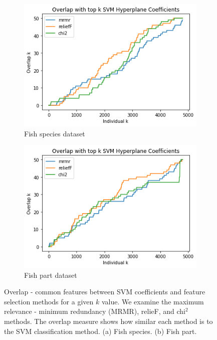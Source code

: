 \documentclass{article}
\begin{document}
\begin{figure}[htb]
  \centering
  \begin{subfigure}[b]{\linewidth}
    \includegraphics[width=1\linewidth]{fish_overlap_with_coefficients.png}
    \caption{Fish species dataset}
    \label{fig:fish-hyperplane-overlap}
  \end{subfigure}

  \begin{subfigure}[b]{\linewidth}
    \includegraphics[width=1\linewidth]{part_overlap_with_coefficients.png}
    \caption{Fish part dataset}
    \label{fig:part-hyperplane-overlap}
  \end{subfigure}
  \caption[Two numerical solutions]{
    Overlap - common features between SVM coefficients and feature selection methods for a given $k$ value.
    We examine the maximum relevance - minimum redundancy (MRMR), relieF, and chi$^2$ methods.
    The overlap measure shows how similar each method is to the SVM classification method.
    (a) Fish species. (b) Fish part.}
  \label{hyperplane-overlap}
\end{figure}
\end{document}
